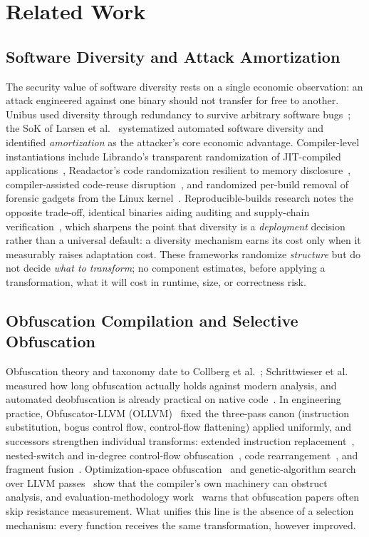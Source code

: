 \documentclass[pdflatex,sn-mathphys-num]{sn-jnl}
\theoremstyle{thmstyleone}%
\theoremstyle{thmstyletwo}%
\theoremstyle{thmstylethree}%
\begin{document}
\section{Related Work}

\subsection{Software Diversity and Attack Amortization}

The security value of software diversity rests on a single economic observation: an
attack engineered against one binary should not transfer for free to another. Unibus
used diversity through redundancy to survive arbitrary software
bugs~\cite{franz2010unibus}; the SoK of Larsen et al.~\cite{bib2} systematized
automated software diversity and identified \emph{amortization} as the attacker's core
economic advantage. Compiler-level instantiations include Librando's transparent
randomization of JIT-compiled applications~\cite{homescu2013librando}, Readactor's code
randomization resilient to memory disclosure~\cite{crane2015readactor},
compiler-assisted code-reuse disruption~\cite{koo2018ccr}, and randomized per-build
removal of forensic gadgets from the Linux kernel~\cite{franzen2023randcompile}.
Reproducible-builds research notes the opposite trade-off, identical binaries aiding
auditing and supply-chain verification~\cite{fourn2023reproducible}, which sharpens the
point that diversity is a \emph{deployment} decision rather than a universal default:
a diversity mechanism earns its cost only when it measurably raises adaptation cost.
These frameworks randomize \emph{structure} but do not decide \emph{what to
transform}; no component estimates, before applying a transformation, what it will
cost in runtime, size, or correctness risk.

\subsection{Obfuscation Compilation and Selective Obfuscation}

Obfuscation theory and taxonomy date to Collberg et al.~\cite{bib6};
Schrittwieser et al.~\cite{bib7} measured how long obfuscation actually holds against
modern analysis, and automated deobfuscation is already practical on native
code~\cite{bib5}. In engineering practice, Obfuscator-LLVM (OLLVM)~\cite{bib8} fixed
the three-pass canon (instruction substitution, bogus control flow, control-flow
flattening) applied uniformly, and successors strengthen individual transforms:
extended instruction replacement~\cite{bib9}, nested-switch and in-degree control-flow
obfuscation~\cite{bib10}, code rearrangement~\cite{bib11}, and fragment
fusion~\cite{bib12}. Optimization-space obfuscation~\cite{bib13} and genetic-algorithm
search over LLVM passes~\cite{bib14} show that the compiler's own machinery can
obstruct analysis, and evaluation-methodology work~\cite{bib15} warns that
obfuscation papers often skip resistance measurement. What unifies this line is the
absence of a selection mechanism: every function receives the same transformation,
however improved.
\end{document}
